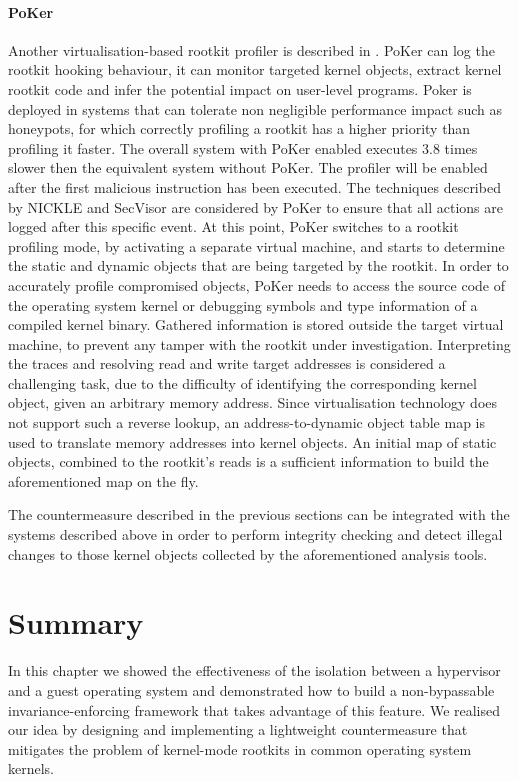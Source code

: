\paragraph{PoKer}
Another virtualisation-based rootkit profiler is described in \cite{PoKer}. PoKer can log the rootkit hooking behaviour, it can monitor targeted kernel objects, extract kernel rootkit code and infer the potential impact on user-level programs. Poker is deployed in systems that can tolerate non negligible performance impact such as honeypots, for which correctly profiling a rootkit has a higher priority than profiling it faster. The overall system with PoKer enabled executes 3.8 times slower then the equivalent system without PoKer.
The profiler will be enabled after the first malicious instruction has been executed. The techniques described by NICKLE and SecVisor are considered by PoKer to ensure that all actions are logged after this specific event.
At this point, PoKer switches to a rootkit profiling mode, by activating a separate virtual machine, and starts to determine the static and dynamic objects that are being targeted by the rootkit. In order to accurately profile compromised objects, PoKer needs to access the source code of the operating system kernel or debugging symbols and type information of a compiled kernel binary. Gathered information is stored outside the target virtual machine, to prevent any tamper with the rootkit under investigation.
Interpreting the traces and resolving read and write target addresses is considered a challenging task, due to the difficulty of identifying the corresponding kernel object, given an arbitrary memory address.
Since virtualisation technology does not support such a reverse lookup, an address-to-dynamic object table map is used to translate memory addresses into kernel objects. An initial map of static objects, combined to the rootkit's reads is a sufficient information to build the aforementioned map on the fly.



The countermeasure described in the previous sections can be integrated with the systems described above in order to perform integrity checking and detect illegal changes to those kernel objects collected by the aforementioned analysis tools.


\section{Summary}\label{hr:conclusion}
In this chapter we showed the effectiveness of the isolation between a hypervisor and a guest operating system and demonstrated how to build a non-bypassable invariance-enforcing framework that takes advantage of this feature.
We realised our idea by designing and implementing a lightweight countermeasure that mitigates the problem of kernel-mode rootkits in common operating system kernels.

